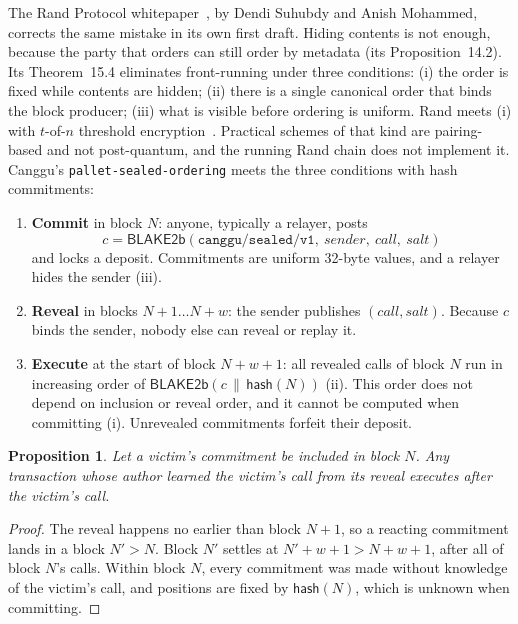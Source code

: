 \documentclass[11pt]{article}
\newtheorem{proposition}[theorem]{Proposition}
\theoremstyle{definition}
\theoremstyle{remark}
\begin{document}
The Rand Protocol whitepaper~\cite{rand}, by Dendi Suhubdy and Anish Mohammed, corrects the same
mistake in its own first draft. Hiding contents is not enough, because the party that orders can still order by
metadata (its Proposition~14.2). Its Theorem~15.4 eliminates front-running under three conditions:
(i) the order is fixed while contents are hidden; (ii) there is a single canonical order that binds
the block producer; (iii) what is visible before ordering is uniform. Rand meets (i) with $t$-of-$n$
threshold encryption~\cite{ferveo}. Practical schemes of that kind are pairing-based and not
post-quantum, and the running Rand chain does not implement it. Canggu's
\texttt{pallet-sealed-ordering} meets the three conditions with hash commitments:

\begin{enumerate}[leftmargin=*]
  \item \textbf{Commit} in block $N$: anyone, typically a relayer, posts
        \[ c = \mathsf{BLAKE2b}(\texttt{canggu/sealed/v1},\ \mathit{sender},\ \mathit{call},\
        \mathit{salt}) \]
        and locks a deposit. Commitments are uniform 32-byte values, and a relayer
        hides the sender (iii).
  \item \textbf{Reveal} in blocks $N{+}1 \dots N{+}w$: the sender publishes $(\mathit{call},
        \mathit{salt})$. Because $c$ binds the sender, nobody else can reveal or replay it.
  \item \textbf{Execute} at the start of block $N{+}w{+}1$: all revealed calls of block $N$ run in
        increasing order of $\mathsf{BLAKE2b}(c \,\|\, \mathsf{hash}(N))$ (ii). This order does not
        depend on inclusion or reveal order, and it cannot be computed when committing (i).
        Unrevealed commitments forfeit their deposit.
\end{enumerate}

\begin{proposition}
Let a victim's commitment be included in block $N$. Any transaction whose author learned the
victim's call from its reveal executes after the victim's call.
\end{proposition}
\begin{proof}
The reveal happens no earlier than block $N{+}1$, so a reacting commitment lands in a block
$N' > N$. Block $N'$ settles at $N'{+}w{+}1 > N{+}w{+}1$, after all of block $N$'s calls. Within
block $N$, every commitment was made without knowledge of the victim's call, and positions are
fixed by $\mathsf{hash}(N)$, which is unknown when committing.
\end{proof}
\end{document}

